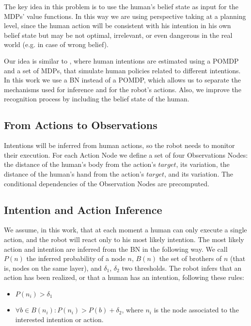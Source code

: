 The key idea in this problem is to use the human's belief state as input for the MDPs' value functions. In this way we are using perspective taking at a planning level, since the human action will be consistent with his intention in his own belief state but may be not optimal, irrelevant, or even dangerous in the real world (e.g. in case of wrong belief).

Our idea is similar to \cite{karami2010human}, where human intentions are estimated using a POMDP and a set of MDPs, that simulate human policies related to different intentions. In this work we use a BN instead of a POMDP, which allows us to separate the mechanisms used for inference and for the robot's actions. Also, we improve the recognition process by including the belief state of the human.

\subsection{From Actions to Observations}
Intentions will be inferred from human actions, so the robot needs to monitor their execution. For each Action Node we define a set of four Observations Nodes: the distance of the human's body from the action's $target$, its variation, the distance of the human's hand from the action's $target$, and its variation. The conditional dependencies of the Observation Nodes are precomputed.

\subsection{Intention and Action Inference}
\label{sec:situation_assessment-intention and action inference}
We assume, in this work, that at each moment a human can only execute a single action, and the robot will react only to his most likely intention. The most likely action and intention are inferred from the BN in the following way. We call $P(n)$ the inferred probability of a node $n$, $B(n)$ the set of brothers of $n$ (that is, nodes on the same layer), and $\delta_1$, $\delta_2$ two thresholds. The robot infers that an action has been realized, or that a human has an intention, following these rules: 
\begin{itemize}
\item  \(P(n_i)>\delta_1\) 
\item  \(\forall b \in B(n_i): P(n_i)>P(b)+\delta_2\), where $n_i$ is the node associated to the interested intention or action.
\end{itemize}

